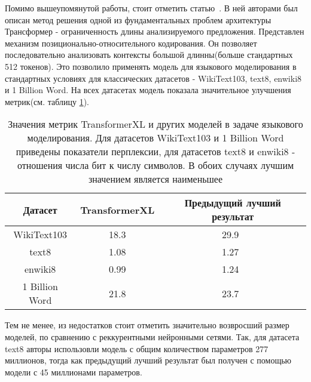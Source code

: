 \par Помимо вышеупомянутой работы, стоит отметить статью~\cite{transfoxl}. В ней авторами был описан метод решения одной из фундаментальных проблем архитектуры Трансформер - ограниченность длины анализируемого предложения. Представлен механизм позиционально-относительного кодирования. Он позволяет последовательно анализовать контексты большой длинны(больше стандартных 512 токенов). Это позволило применять модель для языкового моделирования в стандартных условиях для классических датасетов - WikiText103, text8, enwiki8 и 1 Billion Word. На всех датасетах модель показала значительное улучшения метрик(см. таблицу \ref{transfoxl-metrics}).

\begin{table}[H]
  \caption{Значения метрик TransformerXL и других моделей в задаче языкового моделирования. Для датасетов WikiText103 и 1 Billion Word приведены показатели перплексии, для датасетов text8 и enwiki8 - отношения числа бит к числу символов. В обоих случаях лучшим значением является наименьшее}\label{transfoxl-metrics}
  \begin{tabular}{|c|c|c|}
  \hline
  Датасет & TransformerXL & Предыдущий лучший результат \\
  \hline
  WikiText103    & 18.3 & 29.9~\cite{wikitext-prev} \\
  text8          & 1.08 & 1.27~\cite{text8-prev} \\
  enwiki8        & 0.99 & 1.24~\cite{text8-prev} \\
  1 Billion Word & 21.8 & 23.7~\cite{1b-prev} \\
  \hline 
  \end{tabular}
\end{table}
Тем не менее, из недостатков стоит отметить значительно возвросший размер моделей, по сравнению с реккурентными нейронными сетями. Так, для датасета text8 авторы использовли модель с общим количеством параметров 277 миллионов, тогда как предыдущий лучший результат был получен с помощью модели с 45 миллионами параметров.

